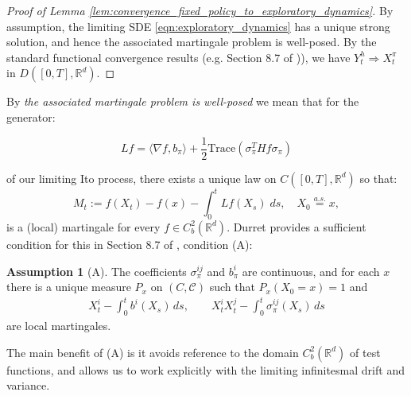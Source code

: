 \documentclass[11pt,oneside,reqno]{article}
\theoremstyle{plain}
\theoremstyle{definition}
\newtheorem*{assumption}{Assumption}
\numberwithin{equation}{section}
\renewcommand{\cite}{\citet}
\newcommand{\R}{\mathbb{R}}
\begin{document}
\begin{proof}[Proof of Lemma \ref{lem:convergence_fixed_policy_to_exploratory_dynamics}]
	By assumption, the limiting SDE \eqref{eqn:exploratory_dynamics} has a unique strong solution, and hence the associated
	martingale problem is well-posed. By the standard functional convergence results (e.g. Section 8.7 of \cite{durrett1996stochastic})), we have $Y^h_t \Rightarrow X^\pi_t$
	in $D([0,T], \R^d)$.
\end{proof}

\noindent By \textit{the associated martingale problem is well-posed} we mean that for the generator:

\[Lf = \langle\nabla f,  b_\pi \rangle + \frac{1}{2} \mathrm{Trace}(\sigma_\pi^T Hf \sigma_\pi) \]

\noindent of our limiting Ito process, there exists a unique law on $C([0,T], \R^d)$ so that:
%
\[M_t := f(X_t) - f(x) - \int_0^t Lf(X_s) \; ds, \quad X_0 \overset{a.s.}{=} x,\]
%
\noindent is a (local) martingale for every $f \in C^2_b(\R^d)$. Durret provides a sufficient condition for 
this in Section 8.7 of \cite{durrett1996stochastic}, condition (A):

\begin{assumption}[A]
	\label{assumption:A}
	The coefficients $\sigma_\pi^{ij}$ and $b_\pi^i$ are continuous, and for each $x$ there is a unique measure $P_x$ on $(C,\mathcal C)$ such that $P_x(X_0=x)=1$ and
	\begin{equation*}
	\begin{aligned}
	X_t^i - \int_0^t b^i(X_s)\,ds,
	\qquad
	X_t^iX_t^j - \int_0^t \sigma_\pi^{ij}(X_s)\,ds
	\end{aligned}
	\end{equation*}
	are local martingales.
\end{assumption}

The main benefit of (A) is it avoids reference
to the domain $C_b^2(\R^d)$ of test functions, and allows us to work explicitly with the limiting infinitesmal drift 
and variance. 


\end{document}
